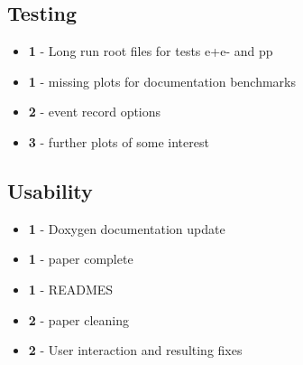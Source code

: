\documentclass[]{Photos_interface_design}
\begin{document}
\subsection*{Testing}
\begin{itemize}
  \item[\ding{111}]{\bf 1} - Long run root files for tests e+e- and pp
  \item[\ding{111}]{\bf 1} - missing plots for documentation benchmarks
  \item[\ding{111}]{\bf 2} - event record options
  \item[\ding{111}]{\bf 3} - further plots of some interest
\end{itemize}

\subsection*{Usability}
\begin{itemize}
  \item[\ding{111}]{\bf 1} - Doxygen documentation update
  \item[\ding{111}]{\bf 1} - paper complete
  \item[\ding{111}]{\bf 1} - READMES 
  \item[\ding{111}]{\bf 2} - paper cleaning
  \item[\ding{111}]{\bf 2} - User interaction and resulting fixes
\end{itemize}
\end{document}
